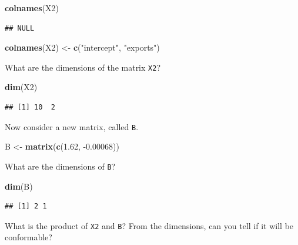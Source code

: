 \documentclass[]{book}
\newenvironment{Shaded}{\begin{snugshade}}{\end{snugshade}}
\newcommand{\FloatTok}[1]{\textcolor[rgb]{0.00,0.00,0.81}{#1}}
\newcommand{\KeywordTok}[1]{\textcolor[rgb]{0.13,0.29,0.53}{\textbf{#1}}}
\newcommand{\NormalTok}[1]{#1}
\newcommand{\StringTok}[1]{\textcolor[rgb]{0.31,0.60,0.02}{#1}}
\theoremstyle{definition}
\theoremstyle{definition}
\theoremstyle{definition}
\theoremstyle{remark}
\begin{document}
\begin{Shaded}
\begin{Highlighting}[]
\KeywordTok{colnames}\NormalTok{(X2)}
\end{Highlighting}
\end{Shaded}

\begin{verbatim}
## NULL
\end{verbatim}

\begin{Shaded}
\begin{Highlighting}[]
\KeywordTok{colnames}\NormalTok{(X2) <-}\StringTok{ }\KeywordTok{c}\NormalTok{(}\StringTok{"intercept"}\NormalTok{, }\StringTok{"exports"}\NormalTok{)}
\end{Highlighting}
\end{Shaded}

What are the dimensions of the matrix \texttt{X2}?

\begin{Shaded}
\begin{Highlighting}[]
\KeywordTok{dim}\NormalTok{(X2)}
\end{Highlighting}
\end{Shaded}

\begin{verbatim}
## [1] 10  2
\end{verbatim}

Now consider a new matrix, called \texttt{B}.

\begin{Shaded}
\begin{Highlighting}[]
\NormalTok{B <-}\StringTok{ }\KeywordTok{matrix}\NormalTok{(}\KeywordTok{c}\NormalTok{(}\FloatTok{1.62}\NormalTok{, }\FloatTok{-0.00068}\NormalTok{))}
\end{Highlighting}
\end{Shaded}

What are the dimensions of \texttt{B}?

\begin{Shaded}
\begin{Highlighting}[]
\KeywordTok{dim}\NormalTok{(B)}
\end{Highlighting}
\end{Shaded}

\begin{verbatim}
## [1] 2 1
\end{verbatim}

What is the product of \texttt{X2} and \texttt{B}? From the dimensions, can you tell if it will be conformable?
\end{document}
